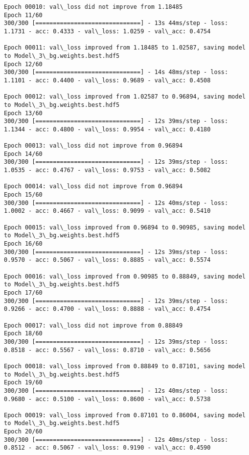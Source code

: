 \documentclass[11pt]{article}
\begin{document}
\begin{Verbatim}[commandchars=\\\{\}]
Epoch 00010: val\_loss did not improve from 1.18485
Epoch 11/60
300/300 [==============================] - 13s 44ms/step - loss: 1.1731 - acc: 0.4333 - val\_loss: 1.0259 - val\_acc: 0.4754

Epoch 00011: val\_loss improved from 1.18485 to 1.02587, saving model to Model\_3\_bg.weights.best.hdf5
Epoch 12/60
300/300 [==============================] - 14s 48ms/step - loss: 1.1101 - acc: 0.4400 - val\_loss: 0.9689 - val\_acc: 0.4508

Epoch 00012: val\_loss improved from 1.02587 to 0.96894, saving model to Model\_3\_bg.weights.best.hdf5
Epoch 13/60
300/300 [==============================] - 12s 39ms/step - loss: 1.1344 - acc: 0.4800 - val\_loss: 0.9954 - val\_acc: 0.4180

Epoch 00013: val\_loss did not improve from 0.96894
Epoch 14/60
300/300 [==============================] - 12s 39ms/step - loss: 1.0535 - acc: 0.4767 - val\_loss: 0.9753 - val\_acc: 0.5082

Epoch 00014: val\_loss did not improve from 0.96894
Epoch 15/60
300/300 [==============================] - 12s 40ms/step - loss: 1.0002 - acc: 0.4667 - val\_loss: 0.9099 - val\_acc: 0.5410

Epoch 00015: val\_loss improved from 0.96894 to 0.90985, saving model to Model\_3\_bg.weights.best.hdf5
Epoch 16/60
300/300 [==============================] - 12s 39ms/step - loss: 0.9570 - acc: 0.5067 - val\_loss: 0.8885 - val\_acc: 0.5574

Epoch 00016: val\_loss improved from 0.90985 to 0.88849, saving model to Model\_3\_bg.weights.best.hdf5
Epoch 17/60
300/300 [==============================] - 12s 39ms/step - loss: 0.9266 - acc: 0.4700 - val\_loss: 0.8888 - val\_acc: 0.4754

Epoch 00017: val\_loss did not improve from 0.88849
Epoch 18/60
300/300 [==============================] - 12s 39ms/step - loss: 0.8518 - acc: 0.5567 - val\_loss: 0.8710 - val\_acc: 0.5656

Epoch 00018: val\_loss improved from 0.88849 to 0.87101, saving model to Model\_3\_bg.weights.best.hdf5
Epoch 19/60
300/300 [==============================] - 12s 40ms/step - loss: 0.9680 - acc: 0.5100 - val\_loss: 0.8600 - val\_acc: 0.5738

Epoch 00019: val\_loss improved from 0.87101 to 0.86004, saving model to Model\_3\_bg.weights.best.hdf5
Epoch 20/60
300/300 [==============================] - 12s 40ms/step - loss: 0.8512 - acc: 0.5067 - val\_loss: 0.9190 - val\_acc: 0.4590


\end{Verbatim}
\end{document}
